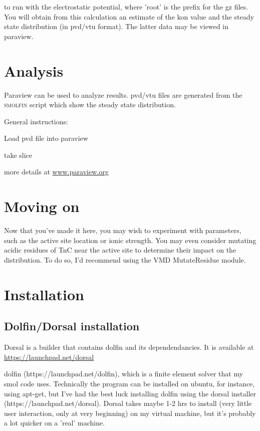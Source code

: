 \documentclass{article}
\begin{document}
to run with the electrostatic potential, where 'root' is the prefix for the gz files. You will obtain from this calculation an estimate of the kon value and the steady state distribution (in pvd/vtu format). The latter data may be viewed in paraview. 

\section{Analysis}
\label{paraview}

Paraview can be used to analyze results.  pvd/vtu files are generated from the \textsc{smolfin} script which show the steady state
distribution. 

General instructions:
\lbi
\item Load pvd file into paraview
\item take slice
\item more details at \url{www.paraview.org}
\lei

\section{Moving on}
Now that you've made it here, you may wish to experiment with parameters, such as the active site location or ionic strength. You may even consider mutating acidic residues of TnC near the active site to determine their impact on the \catwo distribution. To do so, I'd recommend using the VMD MutateResidue module. 

\section{Installation}
\label{install}

\subsection{Dolfin/Dorsal installation}
Dorsal is a builder that contains dolfin and its dependendancies. 
It is available at \url{https://launchpad.net/dorsal}

dolfin (https://launchpad.net/dolfin), which is a finite element solver that my smol code uses. Technically the program can be installed on ubuntu, for instance, using apt-get, but I've had the best luck installing dolfin using the dorsal installer (https://launchpad.net/dorsal). Dorsal takes maybe 1-2 hrs to install (very little user interaction, only at very beginning) on my virtual machine, but it's probably a lot quicker on a 'real' machine. 
\end{document}
